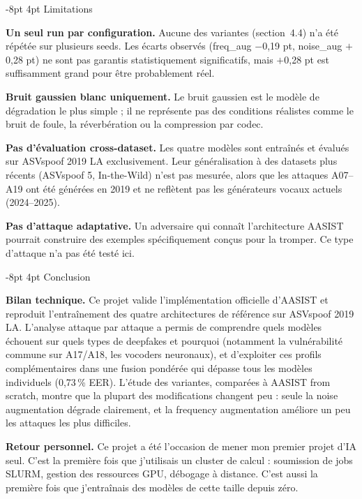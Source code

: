 \documentclass[10pt, a4paper]{article}
\makeatletter
\renewcommand{\section}{\@startsection{section}{1}{\z@}%
  {-8pt \@plus -2pt \@minus -2pt}{4pt \@plus 1pt}%
  {\normalfont\Large\bfseries}}
\makeatother
\begin{document}
\section{Limitations}

\textbf{Un seul run par configuration.} Aucune des variantes (section~4.4) n'a été répétée sur plusieurs seeds. Les écarts observés (freq\_aug $-$0,19 pt, noise\_aug $+$0,28 pt) ne sont pas garantis statistiquement significatifs, mais $+$0,28 pt est suffisamment grand pour être probablement réel.

\textbf{Bruit gaussien blanc uniquement.} Le bruit gaussien est le modèle de dégradation le plus simple ; il ne représente pas des conditions réalistes comme le bruit de foule, la réverbération ou la compression par codec.

\textbf{Pas d'évaluation cross-dataset.} Les quatre modèles sont entraînés et évalués sur ASVspoof 2019 LA exclusivement. Leur généralisation à des datasets plus récents (ASVspoof 5, In-the-Wild) n'est pas mesurée, alors que les attaques A07--A19 ont été générées en 2019 et ne reflètent pas les générateurs vocaux actuels (2024--2025).

\textbf{Pas d'attaque adaptative.} Un adversaire qui connaît l'architecture AASIST pourrait construire des exemples spécifiquement conçus pour la tromper. Ce type d'attaque n'a pas été testé ici.

\section{Conclusion}

\textbf{Bilan technique.} Ce projet valide l'implémentation officielle d'AASIST et reproduit l'entraînement des quatre architectures de référence sur ASVspoof 2019 LA. L'analyse attaque par attaque a permis de comprendre quels modèles échouent sur quels types de deepfakes et pourquoi (notamment la vulnérabilité commune sur A17/A18, les vocoders neuronaux), et d'exploiter ces profils complémentaires dans une fusion pondérée qui dépasse tous les modèles individuels (0,73\,\% EER). L'étude des variantes, comparées à AASIST from scratch, montre que la plupart des modifications changent peu : seule la noise augmentation dégrade clairement, et la frequency augmentation améliore un peu les attaques les plus difficiles.

\textbf{Retour personnel.} Ce projet a été l'occasion de mener mon premier projet d'IA seul. C'est la première fois que j'utilisais un cluster de calcul : soumission de jobs SLURM, gestion des ressources GPU, débogage à distance. C'est aussi la première fois que j'entraînais des modèles de cette taille depuis zéro.
\end{document}
